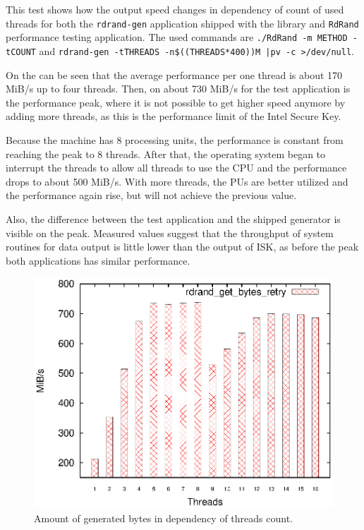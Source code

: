 This test shows how the output speed changes in dependency of count of used threads for both the {\tt rdrand-gen} application shipped with the library and {\tt RdRand} performance testing application. The used commands are {\tt ./RdRand -m METHOD -tCOUNT} and {\tt rdrand-gen -tTHREADS -n\$((THREADS*400))M |pv -c >/dev/null}.

On the  can be seen that the average performance per one thread is about 170 MiB/s up to four threads. Then, on about 730 MiB/s for the test application is the performance peak, where it is not possible to get higher speed anymore by adding more threads, as this is the performance limit of the Intel Secure Key. 

Because the machine has 8 processing units, the performance is constant from reaching the peak to 8 threads. After that, the operating system began to interrupt the threads to allow all threads to use the CPU and the performance drops to about 500 MiB/s. With more threads, the PUs are better utilized and the performance again rise, but will not achieve the previous value.

Also, the difference between the test application and the shipped generator is visible on the peak. Measured values suggest that the throughput of system routines for data output is little lower than the output of ISK, as before the peak both applications has similar performance.

\begin{figure}[h!]
  \centering
 \includegraphics[width=15cm]{fig/tests/threads_scalability.eps} %
\caption{Amount of generated bytes in dependency of threads count.}
\label{fig:testing:threadsScalability}
\end{figure}

